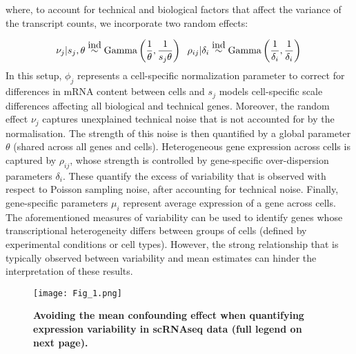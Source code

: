 where, to account for technical and biological factors that affect the variance of the transcript counts, we incorporate two random effects: 

\begin{equation} \label{eq::RandomEffectsBASiCS}
\nu_j|s_j,\theta \stackrel{\mbox{ind}}{\sim} \textnormal{Gamma}\left(\frac{1}{\theta},\frac{1}{s_j\theta}\right) \hspace{0.2cm} \rho_{ij}|\delta_i  \stackrel{\mbox{ind}}{\sim} \textnormal{Gamma}\left(\frac{1}{\delta_i},\frac{1}{\delta_i}\right)\\
\end{equation} In this setup, $\phi_j$ represents a cell-specific normalization parameter to correct for differences in mRNA content between cells and $s_j$ models cell-specific scale differences affecting all biological and technical genes. Moreover, the random effect $\nu_j$ captures unexplained technical noise that is not accounted for by the normalisation. The strength of this noise is then quantified by a global parameter $\theta$ (shared across all genes and cells). Heterogeneous gene expression across cells is captured by $\rho_{ij}$, whose strength is controlled by gene-specific over-dispersion parameters $\delta_i$. These quantify the excess of variability that is observed with respect to Poisson sampling noise, after accounting for technical noise. Finally, gene-specific parameters $\mu_i$ represent average expression of a gene across cells. \\

The aforementioned measures of variability can be used to identify genes whose transcriptional heterogeneity differs between groups of cells (defined by experimental conditions or cell types). However, the strong relationship that is typically observed between variability and mean estimates \citep{Brennecke2013} can hinder the interpretation of these results. \\

\begin{figure}[!h]
\centering
\texttt{[image: Fig\_1.png]}
\caption[Avoiding the mean confounding effect in scRNAseq data]{\textbf{Avoiding the mean confounding effect when quantifying expression variability in scRNAseq data (full legend on next page).}\\}
\label{fig2:Schematic_model}
\end{figure}

\newpage

